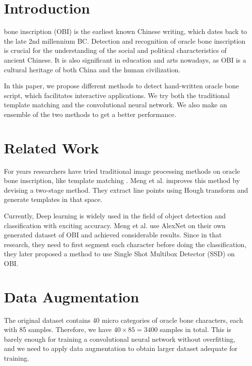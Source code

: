 \documentclass[journal]{IEEEtran}
\begin{document}
\IEEEpeerreviewmaketitle



\section{Introduction}
 bone inscription (OBI) is the earliest known Chinese writing, which dates back to the late 2nd millennium BC. Detection and recognition of oracle bone inscription is crucial for the understanding of the social and political characteristics of ancient Chinese. It is also significant in education and arts nowadays, as OBI is a cultural heritage of both China and the human civilization.

In this paper, we propose different methods to detect hand-written oracle bone script, which facilitates interactive applications. We try both the traditional template matching and the convolutional neural network. We also make an ensemble of the two methods to get a better performance.

\section{Related Work}
For years researchers have tried traditional image processing methods on oracle bone inscription, like template matching \cite{tm}. Meng et al. \cite{tm1} improves this method by devising a two-stage method. They extract line points using Hough transform and generate templates in that space. 

Currently, Deep learning is widely used in the field of object detection and classification with exciting accuracy. Meng et al. \cite{conv} use AlexNet on their own generated dataset of OBI and achieved considerable results. Since in that research, they need to first segment each character before doing the classification, they later proposed a method \cite{ssd} to use Single Shot Multibox Detector (SSD) on OBI.


\section{Data Augmentation}
The original dataset contains 40 micro categories of oracle bone characters, each with 85 samples.
Therefore, we have $40 \times 85 = 3400$ samples in total.
This is barely enough for training a convolutional neural network without overfitting, and we need to apply data augmentation to obtain larger dataset adequate for training.
\end{document}
